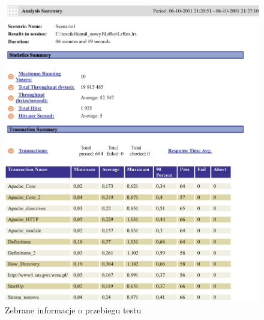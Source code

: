 \begin{figure}[h]
\centering
\includegraphics[width=\textwidth]{./rysunki/summary-test.eps}
\caption{Zebrane informacje o przebiegu testu}
\label{zebrane}
\end{figure}
